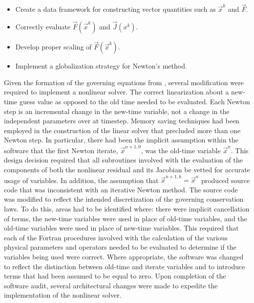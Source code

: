 \begin{itemize}
\item{Create a data framework for constructing vector quantities such as $\vec{x}^{k}$ and $\vec{F}$.}
\item{Correctly evaluate $\vec{F}(\vec{x}^{k})$ and $\vec{J}(x^{k})$.}
\item{Develop proper scaling of $\vec{F}(\vec{x}^{k})$.}
\item{Implement a globalization strategy for Newton's method.}
\end{itemize}

Given the formation of the governing equations from , several modification were required to implement a nonlinear solver.
The correct linearization about a new-time guess value as opposed to the old time needed to be evaluated.
Each Newton step is an incremental change in the new-time variable, not a change in the independent parameters over at timestep.
Memory saving techniques had been employed in the construction of the linear solver that precluded more than one Newton step.
In particular, there had been the implicit assumption within the software that the first Newton iterate, $\vec{x}^{n+1, 0}$, was the old-time variable $\vec{x}^{n}$.
This design decision required that all subroutines involved with the evaluation of the components of both the nonlinear residual and its Jacobian be vetted for accurate usage of variables.
In addition, the assumption that $\vec{x}^{n+1, k} = \vec{x}^{n}$ produced source code that was inconsistent with an iterative Newton method.
The source code was modified to reflect the intended discretization of the governing conservation laws.
To do this, areas had to be identified where: there were implicit cancellation of terms, the new-time variables were used in place of old-time variables, and the old-time variables were used in place of new-time variables.
This required that each of the Fortran procedures involved with the calculation of the various physical parameters and operators needed to be evaluated to determine if the variables being used were correct.
Where appropriate, the software was changed to reflect the distinction between old-time and iterate variables and to introduce terms that had been assumed to be equal to zero.
Upon completion of the software audit, several architectural changes were made to expedite the implementation of the nonlinear solver.

